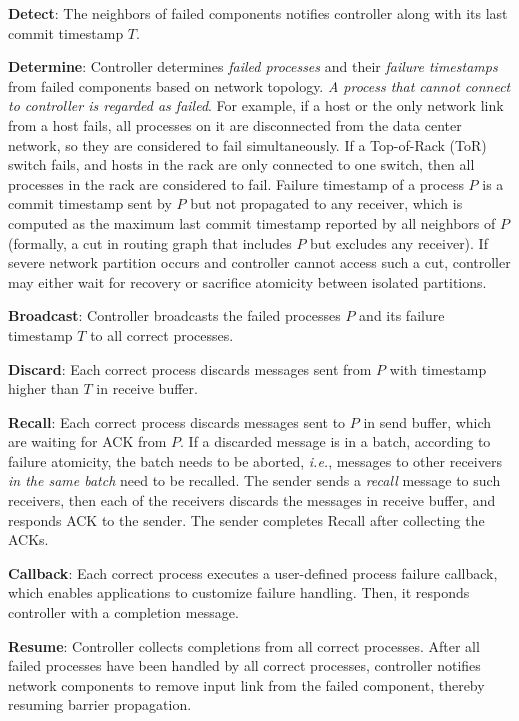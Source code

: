 \begin{ecompact}
\item \textbf{Detect}: The neighbors of failed components notifies controller along with its last commit timestamp $T$.
\item \textbf{Determine}: Controller determines \emph{failed processes} and their \emph{failure timestamps} from failed components based on network topology. \emph{A process that cannot connect to controller is regarded as failed}.
For example, if a host or the only network link from a host fails, all processes on it are disconnected from the data center network, so they are considered to fail simultaneously.
If a Top-of-Rack (ToR) switch fails, and hosts in the rack are only connected to one switch, then all processes in the rack are considered to fail.
Failure timestamp of a process $P$ is a commit timestamp sent by $P$ but not propagated to any receiver, which is computed as the maximum last commit timestamp reported by all neighbors of $P$ (formally, a cut in routing graph that includes $P$ but excludes any receiver).
If severe network partition occurs and controller cannot access such a cut, controller may either wait for recovery or sacrifice atomicity between isolated partitions.
\item \textbf{Broadcast}: Controller broadcasts the failed processes $P$ and its failure timestamp $T$ to all correct processes.
\item \textbf{Discard}: Each correct process discards messages sent from $P$ with timestamp higher than $T$ in receive buffer.
\item \textbf{Recall}: Each correct process discards messages sent to $P$ in send buffer, which are waiting for ACK from $P$. If a discarded message is in a batch, according to failure atomicity, the batch needs to be aborted, \emph{i.e.}, messages to other receivers \emph{in the same batch} need to be recalled. The sender sends a \emph{recall} message to such receivers, then each of the receivers discards the messages in receive buffer, and responds ACK to the sender. The sender completes Recall after collecting the ACKs.
\item \textbf{Callback}: Each correct process executes a user-defined process failure callback, which enables applications to customize failure handling. Then, it responds controller with a completion message.
\item \textbf{Resume}: Controller collects completions from all correct processes.
After all failed processes have been handled by all correct processes, controller notifies network components to remove input link from the failed component, thereby resuming barrier propagation.
\end{ecompact}

